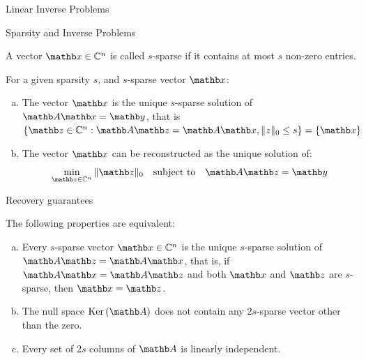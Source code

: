 \documentclass[aspectratio=169,xcolor=dvipsnames]{beamer}
\begin{document}
\begin{frame}{Linear Inverse Problems}

\end{frame}

\begin{frame}{Sparsity and Inverse Problems}
    \begin{definition}[Sparsity]
        A vector $\xb \in \mathbb{C}^n$ is called $s$-sparse if it contains at most $s$ non-zero entries.
    \end{definition}

    \begin{lemma}
        For a given sparsity $s$, and $s$-sparse vector $\xb$:
    \begin{enumerate}[(a)]
        \item The vector $\xb$ is the unique $s$-sparse solution of $\Ab \xb = \yb$, that is $\{\zb \in \mathbb{C}^n : \Ab \zb = \Ab \xb, \|z\|_0 \leq s\} = \{\xb\}$
        \item The vector $\xb$ can be reconstructed as the unique solution of:
        \begin{equation*}
            \label{eq:cs-problem-l0-min}
            \min_{\zb \in \mathbb{C}^n} \|\zb\|_0 \quad \text{subject to} \quad \Ab \zb = \yb
        \end{equation*}
    \end{enumerate}
    \end{lemma}
\end{frame}

\begin{frame}{Recovery guarantees}
    \begin{theorem}
        The following properties are equivalent:
\begin{enumerate}[(a)]
    \item Every $s$-sparse vector $\xb \in \mathbb{C}^n$ is the unique $s$-sparse solution of $\Ab \zb = \Ab \xb$, that is, if $\Ab \xb = \Ab \zb$ and both $\xb$ and $\zb$ are $s$-sparse, then $\xb = \zb$.
    \item The null space $\ker(\Ab)$ does not contain any $2s$-sparse vector other than the zero.
    \item Every set of $2s$ columns of $\Ab$ is linearly independent.
\end{enumerate}
    \end{theorem}
\end{frame}
\end{document}
